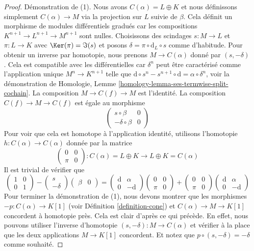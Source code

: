 \begin{proof}
Démonstration de (1). Nous avons $C(\alpha) = L \oplus K$ et nous définissons
simplement $C(\alpha) \to M$ via la projection sur $L$ suivie de $\beta$. Cela
définit un morphisme de modules différentiels gradués car les compositions $K^{n +
1} \to L^{n + 1} \to M^{n + 1}$ sont nulles. Choisissons des scindages $s : M \to
L$ et $\pi : L \to K$ avec $\Ker(\pi) = \Im(s)$ et posons $\delta = \pi \circ
\text{d}_L \circ s$ comme d'habitude. Pour obtenir un inverse par homotopie, nous
prenons $M \to C(\alpha)$ donné par $(s , -\delta)$. Cela est compatible avec les
différentielles car $\delta^n$ peut être caractérisé comme l'application unique
$M^n \to K^{n + 1}$ telle que $\text{d} \circ s^n - s^{n + 1} \circ \text{d} =
\alpha \circ \delta^n$, voir la démonstration de
Homologie, Lemme \ref{homology-lemma-ses-termwise-split-cochain}. La composition
$M \to C(f) \to M$ est l'identité. La composition $C(f) \to M \to C(f)$ est égale
au morphisme
$$
\left(
\begin{matrix}
s \circ \beta & 0 \\
-\delta \circ \beta & 0
\end{matrix}
\right)
$$
Pour voir que cela est homotope à l'application identité, utilisons l'homotopie $h
: C(\alpha) \to C(\alpha)$ donnée par la matrice
$$
\left(
\begin{matrix}
0 & 0 \\
\pi & 0
\end{matrix}
\right) :
C(\alpha) = L \oplus K
\to
L \oplus K = C(\alpha)
$$
Il est trivial de vérifier que
$$
\left(
\begin{matrix}
1 & 0 \\
0 & 1
\end{matrix}
\right)
-
\left(
\begin{matrix}
s \\
-\delta
\end{matrix}
\right)
\left(
\begin{matrix}
\beta & 0
\end{matrix}
\right)
=
\left(
\begin{matrix}
\text{d} & \alpha \\
0 & -\text{d}
\end{matrix}
\right)
\left(
\begin{matrix}
0 & 0 \\
\pi & 0
\end{matrix}
\right)
+
\left(
\begin{matrix}
0 & 0 \\
\pi & 0
\end{matrix}
\right)
\left(
\begin{matrix}
\text{d} & \alpha \\
0 & -\text{d}
\end{matrix}
\right)
$$
Pour terminer la démonstration de (1), nous devons montrer que les morphismes $-p
: C(\alpha) \to K[1]$ (voir Définition \ref{definition-cone}) et $C(\alpha) \to M
\to K[1]$ concordent à homotopie près. Cela est clair d'après ce qui précède. En
effet, nous pouvons utiliser l'inverse d'homotopie $(s, -\delta) : M \to
C(\alpha)$ et vérifier à la place que les deux applications $M \to K[1]$
concordent. Et notez que $p \circ (s, -\delta) = -\delta$ comme souhaité.


\end{proof}
